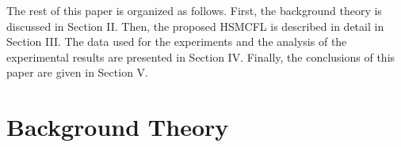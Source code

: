 \documentclass[lettersize,journal]{IEEEtran}
\begin{document}
 The rest of this paper is organized as follows. First, the background theory is discussed in Section II. Then, the proposed HSMCFL is described in detail in Section III. The data used for the experiments and the analysis of the experimental results are presented in Section IV. Finally, the conclusions of this paper are given in Section V.

\section{Background Theory}
\end{document}
